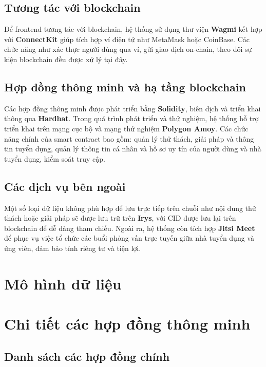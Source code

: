 \subsection{Tương tác với blockchain}

Để frontend tương tác với blockchain, hệ thống sử dụng thư viện \textbf{Wagmi} kết hợp với \textbf{ConnectKit} giúp tích hợp ví điện tử như MetaMask hoặc CoinBase.
Các chức năng như xác thực người dùng qua ví, gửi giao dịch on-chain, theo dõi sự kiện blockchain đều được xử lý tại đây.

\subsection{Hợp đồng thông minh và hạ tầng blockchain}

Các hợp đồng thông minh được phát triển bằng \textbf{Solidity}, biên dịch và triển khai thông qua \textbf{Hardhat}. Trong quá trình phát triển và thử nghiệm, hệ thống hỗ trợ triển khai trên mạng cục bộ và mạng thử nghiệm \textbf{Polygon Amoy}.
Các chức năng chính của smart contract bao gồm: quản lý thử thách, giải pháp và thông tin tuyển dụng, quản lý thông tin cá nhân và hồ sơ uy tín của người dùng và nhà tuyển dụng, kiểm soát truy cập.

\subsection{Các dịch vụ bên ngoài}

Một số loại dữ liệu không phù hợp để lưu trực tiếp trên chuỗi như nội dung thử thách hoặc giải pháp sẽ được lưu trữ trên \textbf{Irys}, với CID được lưu lại trên blockchain để dễ dàng tham chiếu.
Ngoài ra, hệ thống còn tích hợp \textbf{Jitsi Meet} để phục vụ việc tổ chức các buổi phỏng vấn trực tuyến giữa nhà tuyển dụng và ứng viên, đảm bảo tính riêng tư và tiện lợi.

\section{Mô hình dữ liệu}


\section{Chi tiết các hợp đồng thông minh}

\subsection{Danh sách các hợp đồng chính}

